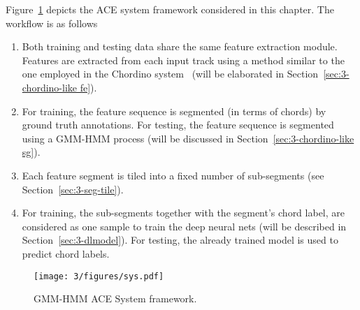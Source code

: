 Figure~\ref{fig:3-sysover} depicts the ACE system framework considered in this chapter. The workflow is as follows%
\begin{enumerate}
	
	\item Both training and testing data share the same feature extraction module. Features are extracted from each input track using a method similar to the one employed in the Chordino system~\cite{mauch2010automatic} (will be elaborated in Section~\ref{sec:3-chordino-like fe}).
	\item For training, the feature sequence is segmented (in terms of chords) by ground truth annotations. For testing, the feature sequence is segmented using a GMM-HMM process (will be discussed in Section~\ref{sec:3-chordino-like sg}).
	\item Each feature segment is tiled into a fixed number of sub-segments (see Section~\ref{sec:3-seg-tile}).
	\item For training, the sub-segments together with the segment's chord label, are considered as one sample to train the deep neural nets (will be described in Section~\ref{sec:3-dlmodel}). For testing, the already trained model is used to predict chord labels.
	
\end{enumerate}


\begin{figure}
\centering
\texttt{[image: 3/figures/sys.pdf]}
\caption{GMM-HMM ACE System framework.}
\label{fig:3-sysover}
\end{figure}

